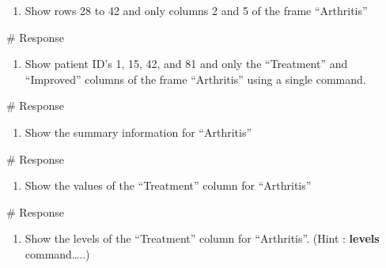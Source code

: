 \documentclass[
  letterpaper,
  DIV=11,
  numbers=noendperiod]{scrreprt}
\newenvironment{Shaded}{\begin{snugshade}}{\end{snugshade}}
\newcommand{\CommentTok}[1]{\textcolor[rgb]{0.37,0.37,0.37}{#1}}
\providecommand{\tightlist}{%
  \setlength{\itemsep}{0pt}\setlength{\parskip}{0pt}}\usepackage{longtable,booktabs,array}
\begin{document}
\begin{enumerate}
\def\labelenumi{\arabic{enumi}.}
\setcounter{enumi}{4}
\tightlist
\item
  Show rows 28 to 42 and only columns 2 and 5 of the frame ``Arthritis''
\end{enumerate}

\begin{Shaded}
\begin{Highlighting}[]
\CommentTok{\# Response}
\end{Highlighting}
\end{Shaded}

\begin{enumerate}
\def\labelenumi{\arabic{enumi}.}
\setcounter{enumi}{5}
\tightlist
\item
  Show patient ID's 1, 15, 42, and 81 and only the ``Treatment'' and
  ``Improved'' columns of the frame ``Arthritis'' using a single
  command.
\end{enumerate}

\begin{Shaded}
\begin{Highlighting}[]
\CommentTok{\# Response}
\end{Highlighting}
\end{Shaded}

\begin{enumerate}
\def\labelenumi{\arabic{enumi}.}
\setcounter{enumi}{6}
\tightlist
\item
  Show the summary information for ``Arthritis''
\end{enumerate}

\begin{Shaded}
\begin{Highlighting}[]
\CommentTok{\# Response}
\end{Highlighting}
\end{Shaded}

\begin{enumerate}
\def\labelenumi{\arabic{enumi}.}
\setcounter{enumi}{7}
\tightlist
\item
  Show the values of the ``Treatment'' column for ``Arthritis''
\end{enumerate}

\begin{Shaded}
\begin{Highlighting}[]
\CommentTok{\# Response}
\end{Highlighting}
\end{Shaded}

\begin{enumerate}
\def\labelenumi{\arabic{enumi}.}
\setcounter{enumi}{8}
\tightlist
\item
  Show the levels of the ``Treatment'' column for ``Arthritis''. (Hint :
  \textbf{levels} command\ldots..)
\end{enumerate}
\end{document}
